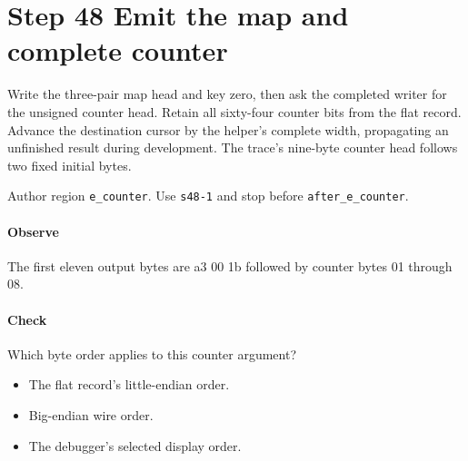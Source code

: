 \section{Step 48 Emit the map and complete counter}\label{cbor-s48}
Write the three-pair map head and key zero, then ask the completed writer for the unsigned counter head. Retain all sixty-four counter bits from the flat record. Advance the destination cursor by the helper's complete width, propagating an unfinished result during development. The trace's nine-byte counter head follows two fixed initial bytes.

Author region \texttt{e\_counter}. Use \texttt{s48-1} and stop before \texttt{after\_e\_counter}. 

\paragraph{Observe} The first eleven output bytes are a3 00 1b followed by counter bytes 01 through 08.

\paragraph{Check} Which byte order applies to this counter argument?
\begin{itemize}
\item[A.] The flat record's little-endian order.
\item[B.] Big-endian wire order.
\item[C.] The debugger's selected display order.
\end{itemize}
